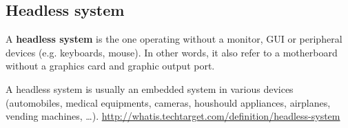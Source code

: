 \subsection{Headless system}
\label{sec:headless_system}

A {\bf headless system} is the one operating without a monitor, GUI or
peripheral devices (e.g.
keyboards, mouse). In other words, it also refer to a motherboard without a
graphics card and graphic output port.

A headless system is usually an embedded system in various devices (automobiles,
medical equipments, cameras, houshould appliances, airplanes, vending machines,
\ldots).
\url{http://whatis.techtarget.com/definition/headless-system}

% 
% 
% 

% 


